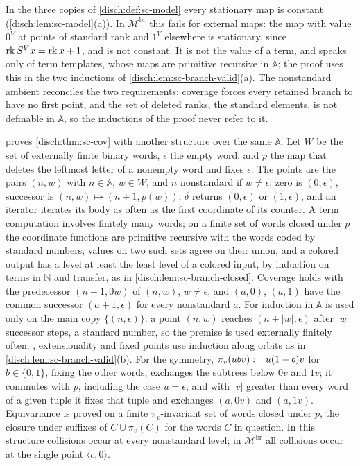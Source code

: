 \begin{remark}
\label{disch:rem:sc-cov-terms}
In the three copies of \cref{disch:def:sc-model} every stationary map is
constant (\cref{disch:lem:sc-model}(a)). In $\mathcal M^{\mathrm{br}}$ this
fails for external maps: the map with value $0^V$ at points of standard rank
and $1^V$ elsewhere is stationary, since $\mathrm{rk}\,S^V x=
\mathrm{rk}\,x+1$, and is not constant. It is not the value of a term, and
 speaks only of term templates, whose maps are primitive
recursive in $\mathbb A$; the proof uses this in the two inductions of
\cref{disch:lem:sc-branch-valid}(a). The nonstandard ambient reconciles the
two requirements: coverage forces every retained branch to have no first
point, and the set of deleted ranks, the standard elements, is not definable
in $\mathbb A$, so the inductions of the proof never refer to it.
\end{remark}

\begin{remark}
\label{disch:rem:sc-cov-words}
 proves \cref{disch:thm:sc-cov} with another
structure over the same $\mathbb A$. Let $W$ be the set of externally finite
binary words, $\epsilon$ the empty word, and $p$ the map that deletes the
leftmost letter of a nonempty word and fixes $\epsilon$. The points are the
pairs $(n,w)$ with $n\in\mathbb A$, $w\in W$, and $n$ nonstandard if
$w\neq\epsilon$; zero is $(0,\epsilon)$, successor is
$(n,w)\mapsto(n+1,p(w))$, $\delta$ returns $(0,\epsilon)$ or $(1,\epsilon)$,
and an iterator iterates its body as often as the first coordinate of its
counter. A term computation involves finitely many words; on a finite set
of words closed under $p$ the coordinate functions are primitive recursive
with the words coded by standard numbers, values on two such sets agree on
their union, and a colored output has a level at least the least level of a
colored input, by induction on terms in $\mathbb N$ and transfer, as in
\cref{disch:lem:sc-branch-closed}. Coverage holds with the predecessor
$(n-1,0w)$ of $(n,w)$, $w\ne\epsilon$, and $(a,0)$, $(a,1)$ have the common
successor $(a+1,\epsilon)$ for every nonstandard $a$. For 
induction in $\mathbb A$ is used only on the main copy
$\{(n,\epsilon)\}$: a point $(n,w)$ reaches $(n+|w|,\epsilon)$ after
$|w|$ successor steps, a standard number, so the premise is used externally
finitely often. , extensionality and fixed points use
induction along orbits as in \cref{disch:lem:sc-branch-valid}(b). For the
symmetry, $\pi_v(ubv)\mathrel{:=} u(1-b)v$ for $b\in\{0,1\}$, fixing the other
words, exchanges the subtrees below $0v$ and $1v$; it commutes with $p$,
including the case $u=\epsilon$, and with $|v|$ greater than every word of a
given tuple it fixes that tuple and exchanges $(a,0v)$ and $(a,1v)$.
Equivariance is proved on a finite $\pi_v$-invariant set of words closed
under $p$, the closure under suffixes of $C\cup\pi_v(C)$ for the words $C$
in question. In this structure collisions occur at every nonstandard level;
in $\mathcal M^{\mathrm{br}}$ all collisions occur at the single point
$\langle c,0\rangle$.
\end{remark}


